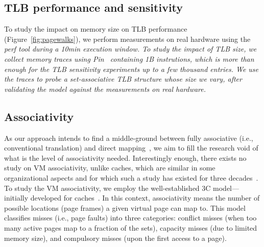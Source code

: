 \subsection{TLB performance and sensitivity}
To study the impact on memory size on TLB performance (Figure~\ref{fig:pagewalks}), we perform measurements on real hardware using the \it{perf} tool during a 10min execution window. To study the impact of TLB size, we collect memory traces using Pin~\cite{luk:pin} containing 1B instrutions, which is more than enough for the TLB sensitivity experiments up to a few thousand entries. We use the traces to probe a set-associative TLB structure whose size we vary, after validating the model against the measurements on real hardware. 

\subsection{Associativity}


As our approach intends to find a middle-ground between fully associative (i.e., conventional translation) and direct mapping~\cite{picorel:near-memory, haria:devirtualizing}, we aim to fill the research void of what is the level of associativity needed. Interestingly enough, there exists no study on VM associativity, unlike caches, which are similar in some organizational aspects and for which such a study has existed for three decades~\cite{hill:aspects}. To study the VM associativity, we employ the well-established 3C model---initially developed for caches~\cite{hill:aspects}. In this context, associativity means the number of possible locations (page frames) a given virtual page can map to. This model classifies misses (i.e., page faults) into three categories: conflict misses (when too many active pages map to a fraction of the sets), capacity misses (due to limited memory size), and compulsory misses (upon the first access to a page). 



